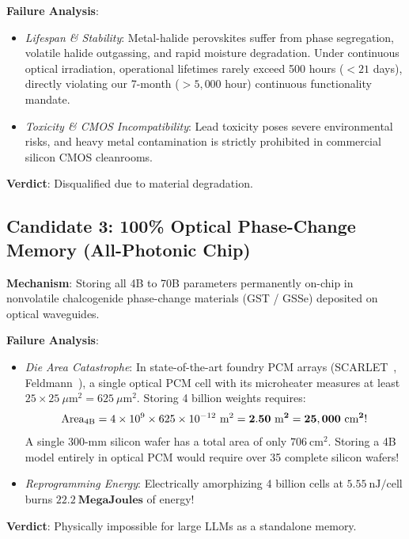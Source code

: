 \documentclass[11pt,a4paper]{report}
\begin{document}
\textbf{Failure Analysis}:
\begin{itemize}
\item \emph{Lifespan \& Stability}: Metal-halide perovskites suffer from phase segregation, volatile halide outgassing, and rapid moisture degradation. Under continuous optical irradiation, operational lifetimes rarely exceed 500 hours ($<21$ days), directly violating our 7-month ($>5,000$ hour) continuous functionality mandate.
\item \emph{Toxicity \& CMOS Incompatibility}: Lead toxicity poses severe environmental risks, and heavy metal contamination is strictly prohibited in commercial silicon CMOS cleanrooms.
\end{itemize}
\textbf{Verdict}: Disqualified due to material degradation.

\subsection{Candidate 3: 100\% Optical Phase-Change Memory (All-Photonic Chip)}
\textbf{Mechanism}: Storing all 4B to 70B parameters permanently on-chip in nonvolatile chalcogenide phase-change materials (GST / GSSe) deposited on optical waveguides.

\textbf{Failure Analysis}:
\begin{itemize}
\item \emph{Die Area Catastrophe}: In state-of-the-art foundry PCM arrays (SCARLET~\cite{Karimi2026}, Feldmann~\cite{Feldmann2019}), a single optical PCM cell with its microheater measures at least $25 \times 25~\mu\text{m}^2 = 625~\mu\text{m}^2$. Storing 4 billion weights requires:
\begin{equation}
\text{Area}_{\rm 4B} = 4 \times 10^9 \times 625 \times 10^{-12}~\text{m}^2 = \mathbf{2.50~\text{m}^2} = \mathbf{25,000~\text{cm}^2}!
\end{equation}
A single 300-mm silicon wafer has a total area of only $706~\text{cm}^2$. Storing a 4B model entirely in optical PCM would require over 35 complete silicon wafers!
\item \emph{Reprogramming Energy}: Electrically amorphizing 4 billion cells at $5.55~\text{nJ/cell}$ burns $\mathbf{22.2~\text{MegaJoules}}$ of energy!
\end{itemize}
\textbf{Verdict}: Physically impossible for large LLMs as a standalone memory.
\end{document}
